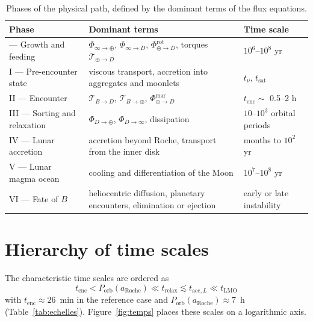 \documentclass[11pt,a4paper,openany]{report}
\newcommand{\aR}{a_{\mathrm{Roche}}}
\begin{document}
\begin{table}[htbp]
\centering
\small
\caption{Phases of the physical path, defined by the dominant terms of the flux equations.}
\label{tab:phases}
\begin{tabularx}{\textwidth}{>{\raggedright\arraybackslash}p{3.1cm}
>{\raggedright\arraybackslash}X >{\raggedright\arraybackslash}p{3.6cm}}
\toprule
\textbf{Phase} & \textbf{Dominant terms} & \textbf{Time scale} \\
\midrule
0 --- Growth and feeding & $\Phi_{\infty\to\oplus}$, $\Phi_{\infty\to D}$, $\Phi^{\mathrm{rot}}_{\oplus\to D}$, torques $\mathcal{T}_{\oplus\to D}$ & $10^{6}$--$10^{8}$ yr \\
I --- Pre-encounter state & viscous transport, accretion into aggregates and moonlets & $t_\nu$, $t_{\mathrm{sat}}$ \\
II --- Encounter & $\mathcal{T}_{B\to D}$, $\mathcal{T}_{B\to\oplus}$, $\Phi^{\mathrm{mar}}_{\oplus\to D}$ & $t_{\mathrm{enc}}\sim$ 0.5--2 h \\
III --- Sorting and relaxation & $\Phi_{D\to\oplus}$, $\Phi_{D\to\infty}$, dissipation & $10$--$10^{3}$ orbital periods \\
IV --- Lunar accretion & accretion beyond Roche, transport from the inner disk & months to $10^{2}$ yr \\
V --- Lunar magma ocean & cooling and differentiation of the Moon & $10^{7}$--$10^{8}$ yr \\
VI --- Fate of $B$ & heliocentric diffusion, planetary encounters, elimination or ejection & early or late instability \\
\bottomrule
\end{tabularx}
\end{table}

\section{Hierarchy of time scales}

The characteristic time scales are ordered as
\begin{equation}
\boxed{\;t_{\mathrm{enc}}<P_{\mathrm{orb}}(\aR)\ll t_{\mathrm{relax}}\lesssim t_{\mathrm{acc},L}
\ll t_{\mathrm{LMO}}\;}
\label{eq:hierarchie-temps}
\end{equation}
with $t_{\mathrm{enc}}\approx26$~min in the reference case and $P_{\mathrm{orb}}(\aR)\approx7$~h
(Table~\ref{tab:echelles}). Figure~\ref{fig:temps} places these scales on a logarithmic axis.
\end{document}
